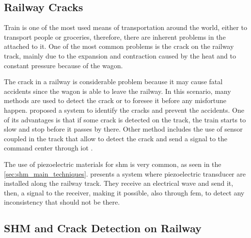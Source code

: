 \subsection{Railway Cracks}

Train is one of the most used means of transportation around the world, either to transport people or groceries, therefore, there are inherent problems in the attached to it. 
One of the most common problems is the crack on the railway track, mainly due to the expansion and contraction caused by the heat and to constant pressure because of the wagon.

The crack in a railway is considerable problem because it may cause fatal accidents since the wagon is able to leave the railway. In this scenario, many methods are used to detect the crack or to foresee it before any misfortune happen. \citet{karthick2017} proposed a system to identify the cracks and prevent the accidents. One of its advantages is that if some crack is detected on the track, the train starts to slow and stop before it passes by there. Other method includes the use of sensor coupled in the track that allow to detect the crack and send a signal to the command center through \gls*{iot} \citep{sakenabenazer2021}.

The use of piezoelectric materials for \gls*{shm} is very common, as seen in the \cref{sec:shm_main_techniques}. \citet{loveday2000} presents a system where piezoelectric transducer are installed along the railway track. 
They receive an electrical wave and send it, then, a signal to the receiver, making it possible, also through \gls*{fem}, to detect any inconsistency that should not be there.

\subsection{SHM and Crack Detection on Railway}